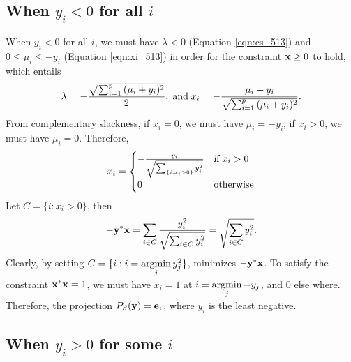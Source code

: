 \documentclass{scrartcl}
\begin{document}
\subsection*{When $y_i < 0$ for all $i$}

When $y_i < 0$ for all $i$, we must have $\lambda < 0$
(Equation \eqref{eqn:cs_513}) and $0 \le \mu_i \le -y_i$ (Equation \eqref{eqn:xi_513})
in order for the constraint $\mathbf{x} \ge 0$ to hold, which entails
\begin{equation}
    \lambda = -{\sqrt{\sum_{i=1}^p {(\mu_i + y_i)^2}} \over 2}, \; \text{and} \;
    x_i = -{\mu_i + y_i \over {\sqrt{\sum_{i=1}^p {(\mu_i + y_i)^2}}}} .
    \label{eqn:lambda_513}
\end{equation}
From complementary slackness, if $x_i = 0$, we must have $\mu_i = -y_i$, if $x_i > 0$,
we must have $\mu_i = 0$. Therefore,
\begin{equation}
    x_i = \begin{cases}
            -{y_i \over {\sqrt{\sum_{\{i:x_i > 0\}} {y_i^2}}}} & \text{if} \; x_i > 0 \\
            0 & \text{otherwise}
          \end{cases}
\end{equation}
Let $C = \{i : x_i > 0\}$, then
\begin{equation}
    -\mathbf{y}^*\mathbf{x}
    = \sum_{i \in C} {y_i^2 \over {\sqrt{\sum_{i \in C} {y_i^2}}}}
    = \sqrt{\sum_{i \in C} {y_i^2}}.
\end{equation}
Clearly, by setting $C = \{i : i = \argmin_j y_j^2\}$, minimizes $-\mathbf{y}^*\mathbf{x}$.
To satisfy the constraint $\mathbf{x}^*\mathbf{x} = 1$, we must have $x_i = 1$ at $i = \argmin_j -y_j$,
and 0 else where. Therefore, the projection $P_S(\mathbf{y}) = \mathbf{e}_i$, where $y_i$ is the least negative.

\subsection*{When $y_i > 0$ for some $i$}
\end{document}
